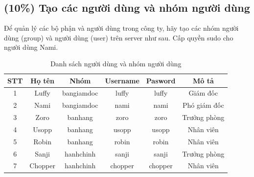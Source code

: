 \documentclass[a4paper, 11pt]{article}
\begin{document}
\subsection{(10\%) Tạo các người dùng và nhóm người dùng}

Để quản lý các bộ phận và người dùng trong công ty, hãy tạo các nhóm người dùng (group) và người dùng (user) trên server như sau. Cấp quyền sudo cho người dùng Nami.

\begin{longtable}{|c|c|c|c|c|c|}
    \caption{Danh sách người dùng và nhóm người dùng}              \\
    \hline
    STT & Họ tên  & Nhóm       & Username & Pasword & Mô tả        \\
    \hline

    1   & Luffy   & bangiamdoc & luffy    & luffy   & Giám đốc     \\
    \hline

    2   & Nami    & bangiamdoc & nami     & nami    & Phó giám đốc \\
    \hline

    3   & Zoro    & banhang    & zoro     & zoro    & Trưởng phòng \\
    \hline

    4   & Usopp   & banhang    & usopp    & usopp   & Nhân viên    \\
    \hline

    5   & Robin   & banhang    & robin    & robin   & Nhân viên    \\
    \hline

    6   & Sanji   & hanhchinh  & sanji    & sanji   & Trưởng phòng \\
    \hline

    7   & Chopper & hanhchinh  & chopper  & chopper & Nhân viên    \\
    \hline
\end{longtable}
\end{document}
